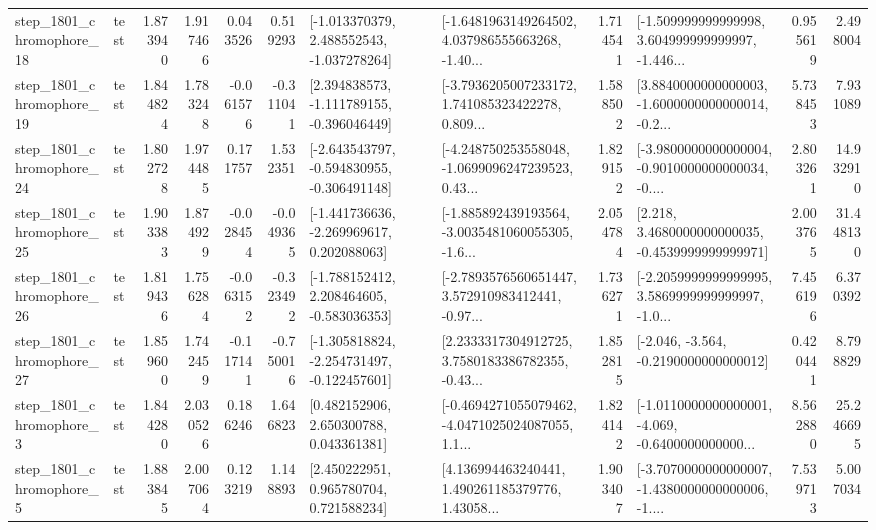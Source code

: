\begin{tabular}{llrrrrllrlrr}
 step\_1801\_chromophore\_18 &      test &      1.873940 &    1.917466 &      0.043526 &  0.519293 &   [-1.013370379, 2.488552543, -1.037278264] &  [-1.6481963149264502, 4.037986555663268, -1.40... &       1.714541 &  [-1.509999999999998, 3.604999999999997, -1.446... &            0.955619 &          2.498004 \\
 step\_1801\_chromophore\_19 &      test &      1.844824 &    1.783248 &     -0.061576 & -0.311041 &   [2.394838573, -1.111789155, -0.396046449] &  [-3.7936205007233172, 1.741085323422278, 0.809... &       1.588502 &  [3.8840000000000003, -1.6000000000000014, -0.2... &            5.738453 &          7.931089 \\
 step\_1801\_chromophore\_24 &      test &      1.802728 &    1.974485 &      0.171757 &  1.532351 &  [-2.643543797, -0.594830955, -0.306491148] &  [-4.248750253558048, -1.0699096247239523, 0.43... &       1.829152 &  [-3.9800000000000004, -0.9010000000000034, -0.... &            2.803261 &         14.932910 \\
 step\_1801\_chromophore\_25 &      test &      1.903383 &    1.874929 &     -0.028454 & -0.049365 &   [-1.441736636, -2.269969617, 0.202088063] &  [-1.885892439193564, -3.0035481060055305, -1.6... &       2.054784 &   [2.218, 3.4680000000000035, -0.4539999999999971] &            2.003765 &         31.448130 \\
 step\_1801\_chromophore\_26 &      test &      1.819436 &    1.756284 &     -0.063152 & -0.323492 &   [-1.788152412, 2.208464605, -0.583036353] &  [-2.7893576560651447, 3.572910983412441, -0.97... &       1.736271 &  [-2.2059999999999995, 3.5869999999999997, -1.0... &            7.456196 &          6.370392 \\
 step\_1801\_chromophore\_27 &      test &      1.859600 &    1.742459 &     -0.117141 & -0.750016 &  [-1.305818824, -2.254731497, -0.122457601] &  [2.2333317304912725, 3.7580183386782355, -0.43... &       1.852815 &              [-2.046, -3.564, -0.2190000000000012] &            0.420441 &          8.798829 \\
  step\_1801\_chromophore\_3 &      test &      1.844280 &    2.030526 &      0.186246 &  1.646823 &     [0.482152906, 2.650300788, 0.043361381] &  [-0.4694271055079462, -4.0471025024087055, 1.1... &       1.824142 &  [-1.0110000000000001, -4.069, -0.6400000000000... &            8.562880 &         25.246695 \\
  step\_1801\_chromophore\_5 &      test &      1.883845 &    2.007064 &      0.123219 &  1.148893 &     [2.450222951, 0.965780704, 0.721588234] &  [4.136994463240441, 1.490261185379776, 1.43058... &       1.903407 &  [-3.7070000000000007, -1.4380000000000006, -1.... &            7.539713 &          5.007034 \\

\end{tabular}
